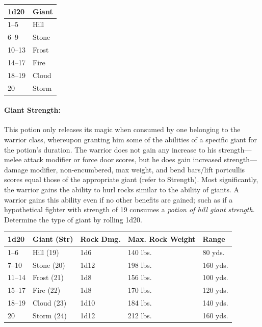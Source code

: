 \begin{multicols}{2}
\noindent
\begin{tabular}{|p{}|p{}|}
\hline
1d20	& Giant \\
\hline\hline
\rowcolor[gray]{.9}1--5	& Hill \\
6--9	& Stone \\
\rowcolor[gray]{.9}10--13	& Frost \\
14--17	& Fire \\
\rowcolor[gray]{.9}18--19	& Cloud \\
20	& Storm \\
\hline
\end{tabular}

\paragraph{Giant Strength:} This potion only releases its magic when consumed by one belonging to the warrior class, whereupon granting him some of the abilities of a specific giant for the potion's duration.  The warrior does not gain any increase to his strength---melee attack modifier or force door scores, but he does gain increased strength---damage modifier, non-encumbered, max weight, and bend bars/lift portcullis scores equal those of the appropriate giant (refer to Strength).  Most significantly, the warrior gains the ability to hurl rocks similar to the ability of giants.  A warrior gains this ability even if no other benefits are gained; such as if a hypothetical fighter with strength of 19 consumes a \textit{potion of hill giant strength}.  Determine the type of giant by rolling 1d20.

\noindent
\begin{tabular}{|m{}|m{}|m{}|m{}|m{}|}
\hline
1d20	& Giant (Str)	& Rock Dmg.	& Max. Rock Weight	& Range \\
\hline\hline
\rowcolor[gray]{.9}1--6	& Hill (19)	& 1d6	& 140 lbs.	& 80 yds. \\
7--10	& Stone (20)	& 1d12	& 198 lbs.	& 160 yds. \\
\rowcolor[gray]{.9}11--14	& Frost (21)	& 1d8	& 156 lbs.	& 100 yds. \\
15--17	& Fire (22)	& 1d8	& 170 lbs.	& 120 yds. \\
\rowcolor[gray]{.9}18--19	& Cloud (23)	& 1d10	& 184 lbs.	& 140 yds. \\
20	& Storm (24)	& 1d12	& 212 lbs.	& 160 yds. \\
\hline
\end{tabular}


\end{multicols}
